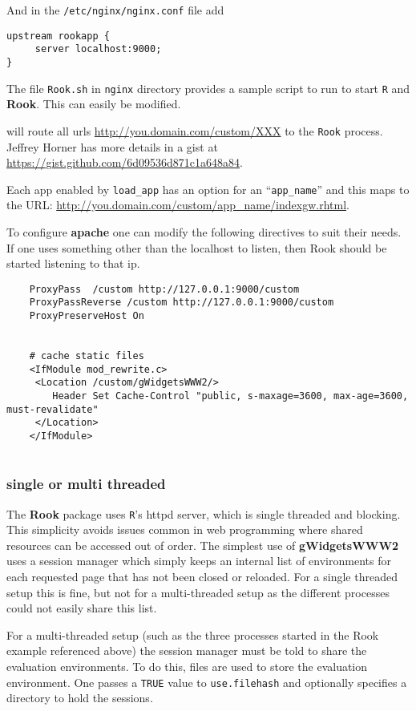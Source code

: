 \documentclass[12pt]{article}
\newcommand{\pkg}[1]{\textbf{#1}}
\newcommand{\code}[1]{\texttt{#1}}
\newcommand{\proglang}[1]{\code{#1}}
\newcommand{\R}{\proglang{R}}
\begin{document}
And in the \code{/etc/nginx/nginx.conf} file add
\begin{verbatim}
upstream rookapp {
	 server localhost:9000;
}
\end{verbatim}


The file \code{Rook.sh} in \code{nginx} directory provides a sample
script to run to start \R{} and \pkg{Rook}. This can easily be modified.


will route all urls \url{http://you.domain.com/custom/XXX} to the
\code{Rook} process. Jeffrey Horner has more details in a gist at
\url{https://gist.github.com/6d09536d871c1a648a84}.
 
 
Each app enabled by \code{load\_app} has an option for an
``\code{app\_name}'' and this maps to the URL:
\url{http://you.domain.com/custom/app\_name/indexgw.rhtml}.


To configure \pkg{apache} one can modify the following directives to
suit their needs. If one uses something other than the localhost to
listen, then Rook should be started listening to that ip.

\begin{verbatim}
    ProxyPass  /custom http://127.0.0.1:9000/custom
    ProxyPassReverse /custom http://127.0.0.1:9000/custom
    ProxyPreserveHost On
    

    # cache static files                                                            
    <IfModule mod_rewrite.c>
     <Location /custom/gWidgetsWWW2/>
        Header Set Cache-Control "public, s-maxage=3600, max-age=3600, must-revalidate"
     </Location>
    </IfModule>
    
\end{verbatim}

\subsubsection{single or multi threaded}
\label{sec:single-or-multi}

The \pkg{Rook} package uses \R's httpd server, which is single
threaded and blocking. This simplicity avoids issues common in web
programming where shared resources can be accessed out of order. The
simplest use of \pkg{gWidgetsWWW2} uses a session manager which simply
keeps an internal list of environments for each requested page that
has not been closed or reloaded. For a single threaded setup this is
fine, but not for a multi-threaded setup as the different processes
could not easily share this list. 

For a multi-threaded setup (such as the three processes started in the
Rook example referenced above) the session manager must be told to
share the evaluation environments. To do this, files are used to store
the evaluation environment. One passes a \code{TRUE} value to
\code{use.filehash} and optionally specifies a directory to hold the
sessions.
\end{document}
